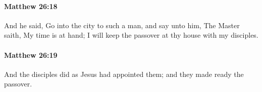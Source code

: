 		\paragraph{Matthew 26:18} %
			\label{MATTHEW-26-18}

			And he said, Go into the city to such a man, and say unto him, The Master saith, My time is at hand; I will keep the passover at thy house with my disciples.

			\begin{framed}
			\scriptsize
				\begin{compactdesc}
					\item[SBLG] 
				\end{compactdesc}
			\end{framed}

		\paragraph{Matthew 26:19} %
			\label{MATTHEW-26-19}

			And the disciples did as Jesus had appointed them; and they made ready the passover.


